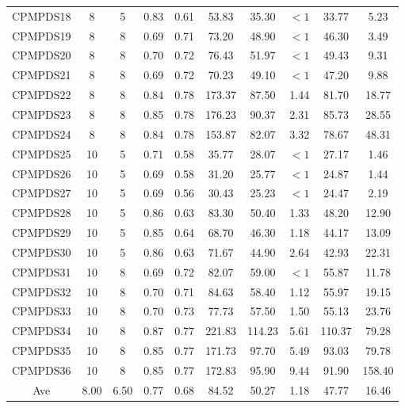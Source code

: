 \documentclass[review,3p,times,authoryear,12pt]{elsarticle}
\begin{document}
\begin{table}[htbp]
\begin{tabular}{c|c|c|c|c|c|c|c|c|c}
    CPMPDS18 & 8     & 5     & 0.83  & 0.61  & 53.83   & 35.30  & $<1$    & 33.77  & 5.23  \\
    CPMPDS19 & 8     & 8     & 0.69  & 0.71  & 73.20   & 48.90  & $<1$    & 46.30  & 3.49  \\
    CPMPDS20 & 8     & 8     & 0.70  & 0.72  & 76.43   & 51.97  & $<1$    & 49.43  & 9.31  \\
    CPMPDS21 & 8     & 8     & 0.69  & 0.72  & 70.23   & 49.10  & $<1$    & 47.20  & 9.88  \\
    CPMPDS22 & 8     & 8     & 0.84  & 0.78  & 173.37  & 87.50  & 1.44    & 81.70  & 18.77  \\
    CPMPDS23 & 8     & 8     & 0.85  & 0.78  & 176.23  & 90.37  & 2.31    & 85.73  & 28.55  \\
    CPMPDS24 & 8     & 8     & 0.84  & 0.78  & 153.87  & 82.07  & 3.32    & 78.67  & 48.31  \\
    CPMPDS25 & 10    & 5     & 0.71  & 0.58  & 35.77   & 28.07  & $<1$    & 27.17  & 1.46  \\
    CPMPDS26 & 10    & 5     & 0.69  & 0.58  & 31.20   & 25.77  & $<1$    & 24.87  & 1.44  \\
    CPMPDS27 & 10    & 5     & 0.69  & 0.56  & 30.43   & 25.23  & $<1$    & 24.47  & 2.19  \\
    CPMPDS28 & 10    & 5     & 0.86  & 0.63  & 83.30   & 50.40  & 1.33    & 48.20  & 12.90  \\
    CPMPDS29 & 10    & 5     & 0.85  & 0.64  & 68.70   & 46.30  & 1.18    & 44.17  & 13.09  \\
    CPMPDS30 & 10    & 5     & 0.86  & 0.63  & 71.67   & 44.90  & 2.64    & 42.93  & 22.31  \\
    CPMPDS31 & 10    & 8     & 0.69  & 0.72  & 82.07   & 59.00  & $<1$    & 55.87  & 11.78  \\
    CPMPDS32 & 10    & 8     & 0.70  & 0.71  & 84.63   & 58.40  & 1.12    & 55.97  & 19.15  \\
    CPMPDS33 & 10    & 8     & 0.70  & 0.73  & 77.73   & 57.50  & 1.50    & 55.13  & 23.76  \\
    CPMPDS34 & 10    & 8     & 0.87  & 0.77  & 221.83  & 114.23 & 5.61    & 110.37 & 79.28  \\
    CPMPDS35 & 10    & 8     & 0.85  & 0.77  & 171.73  & 97.70  & 5.49    & 93.03  & 79.78  \\
    CPMPDS36 & 10    & 8     & 0.85  & 0.77  & 172.83  & 95.90  & 9.44    & 91.90  & 158.40  \\
    \hline
    Ave      & 8.00  & 6.50  & 0.77  & 0.68  & 84.52   & 50.27  & 1.18    & 47.77  & 16.46  \\
    \hline
\end{tabular}
\end{table}%
\end{document}
